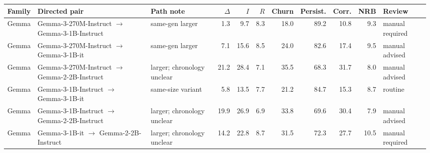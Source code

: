 \begin{tabular}{lllrrrrrrrl}
\toprule
Family & Directed pair & Path note & $\Delta$ & $I$ & $R$ & Churn & Persist. & Corr. & NRB & Review \\
\midrule
Gemma & Gemma-3-270M-Instruct $\rightarrow$ Gemma-3-1B-Instruct & same-gen larger & 1.3 & 9.7 & 8.3 & 18.0 & 89.2 & 10.8 & 9.3 & manual required \\
Gemma & Gemma-3-270M-Instruct $\rightarrow$ Gemma-3-1B-it & same-gen larger & 7.1 & 15.6 & 8.5 & 24.0 & 82.6 & 17.4 & 9.5 & manual advised \\
Gemma & Gemma-3-270M-Instruct $\rightarrow$ Gemma-2-2B-Instruct & larger; chronology unclear & 21.2 & 28.4 & 7.1 & 35.5 & 68.3 & 31.7 & 8.0 & manual advised \\
Gemma & Gemma-3-1B-Instruct $\rightarrow$ Gemma-3-1B-it & same-size variant & 5.8 & 13.5 & 7.7 & 21.2 & 84.7 & 15.3 & 8.7 & routine \\
Gemma & Gemma-3-1B-Instruct $\rightarrow$ Gemma-2-2B-Instruct & larger; chronology unclear & 19.9 & 26.9 & 6.9 & 33.8 & 69.6 & 30.4 & 7.9 & manual advised \\
Gemma & Gemma-3-1B-it $\rightarrow$ Gemma-2-2B-Instruct & larger; chronology unclear & 14.2 & 22.8 & 8.7 & 31.5 & 72.3 & 27.7 & 10.5 & manual required \\
\bottomrule
\end{tabular}
